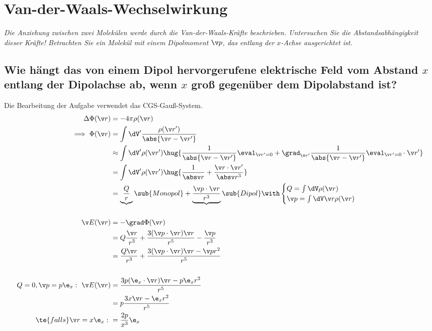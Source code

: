 \documentclass[ex]{exercise_4.1}
\begin{document}
\section{Van-der-Waals-Wechselwirkung}
{\it Die Anziehung zwischen zwei Molekülen werde durch die Van-der-Waals-Kräfte beschrieben. Untersuchen Sie die Abstandsabhängigkeit dieser Kräfte! Betrachten Sie ein Molekül mit einem Dipolmoment $\v p$, das entlang
der $x$-Achse ausgerichtet ist.}

\subsection{Wie hängt das von  einem Dipol hervorgerufene elektrische Feld vom Abstand \(x\) entlang der Dipolachse ab, wenn \(x\) groß gegenüber dem Dipolabstand ist?}

\dottedlinett

Die Bearbeitung der Aufgabe verwendet das CGS-Gauß-System. 
\begin{align*}
    \Delta \Phi(\v r ) &= -4\pi \rho(\v r)\\
    \implies \Phi(\v r) 
    &= \int \dV' \frac{\rho(\v r')}{\abs{\v r - \v r'}}\\
    &\approx \int \dV' \rho(\v r') \hug{\frac{1}{\abs{\v r - \v r'}}\eval_{\v r' =0}+\grad_{\v r'}\frac{1}{\abs{\v r - \v r'}}\eval_{\v r' =0}\cdot \v r'}\\
    &= \int \dV' \rho(\v r') \hug{\frac{1}{\absv r}+\frac{\v r\cdot \v r'}{\absv r^3}}\\
    &= \underbrace{\frac{Q}{r}}\sub{Monopol} + \underbrace{\frac{\v p \cdot \v r }{r^3}}\sub{Dipol} \with \begin{cases}
        Q = \int \dV \rho(\v r)\\
        \v p = \int \dV \v r \rho(\v r)
    \end{cases}\\
    \\
    \v E(\v r) &= -\grad \Phi(\v r) \\
    &= Q\frac{\v r}{r^3} +  \frac{3(\v p \cdot \v r)\v r}{r^5} - \frac{\v p }{r^3}\\
    &= \frac{Q \v r}{r^3} +  \frac{3(\v p \cdot \v r)\v r - \v p r^2}{r^5}\\
    \\
    Q=0, \v p = p \e_x:\ \v E(\v r) 
    &= \frac{3p (\e_x \cdot \v r)\v r - p \e_x r^2}{r^5}\\ 
    &= p\frac{3 x \v r - \e_x r^2}{r^5}\\ 
    \te{falls }\v r = x\e_x: \ &= \frac{2p}{x^3}\e_x
\end{align*}
\end{document}
